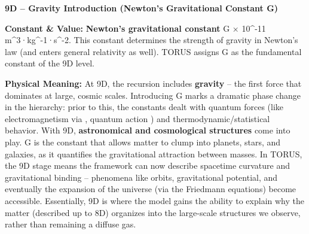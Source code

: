 \documentclass[
]{article}
\begin{document}
{\textbf{9D -- Gravity Introduction (Newton's Gravitational Constant G)}

\textbf{Constant \& Value:} \textbf{Newton's gravitational constant} G  × 10\^{}-11 m\^{}3·kg\^{}-1·s\^{}-2\hspace{0pt}. This constant
determines the strength of gravity in Newton's law (and enters general
relativity as well). TORUS assigns G as the fundamental constant of the
9D level.

\textbf{Physical Meaning:} At 9D, the recursion includes
\textbf{gravity} -- the first force that dominates at large, cosmic
scales. Introducing G marks a dramatic phase change in the hierarchy:
prior to this, the constants dealt with quantum forces (like
electromagnetism via \alpha, quantum action \hbar) and thermodynamic/statistical
behavior. With 9D, \textbf{astronomical and cosmological structures}
come into play\hspace{0pt}. G is the constant that allows matter to
clump into planets, stars, and galaxies, as it quantifies the
gravitational attraction between masses. In TORUS, the 9D stage means
the framework can now describe spacetime curvature and gravitational
binding -- phenomena like orbits, gravitational potential, and
eventually the expansion of the universe (via the Friedmann equations)
become accessible. Essentially, 9D is where the model gains the ability
to explain why the matter (described up to 8D) organizes into the
large-scale structures we observe, rather than remaining a diffuse gas.

}
\end{document}
